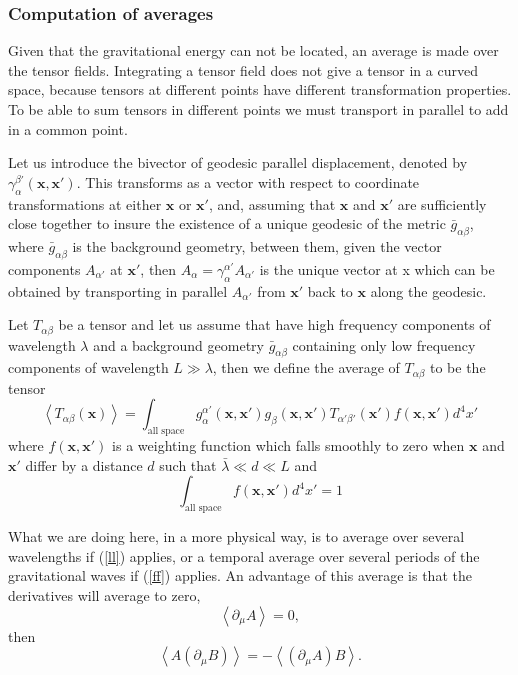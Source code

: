 \subsubsection*{Computation of averages}

Given that the gravitational energy can not be located, an average
is made over the tensor fields. Integrating a tensor field does not
give a tensor in a curved space, because tensors at different points
have different transformation properties. To be able to sum tensors
in different points we must transport in parallel to add in a common
point.

Let us introduce the bivector of geodesic parallel displacement,
denoted by $\gamma_{\alpha}^{\beta'}\left(\boldsymbol{x},\boldsymbol{x}'\right)$.
This transforms as a vector with respect to coordinate transformations
at either $\boldsymbol{x}$ or $\boldsymbol{x}'$, and, assuming that
$\boldsymbol{x}$ and $\boldsymbol{x}'$ are sufficiently close together
to insure the existence of a unique geodesic of the metric $\bar{g}_{\alpha\beta}$,
where $\bar{g}_{\alpha\beta}$ is the background geometry, between
them, given the vector components $A_{\alpha'}$ at $\boldsymbol{x}'$,
then $A_{\alpha}=\gamma_{\alpha}^{\alpha'}A_{\alpha'}$ is the unique
vector at x which can be obtained by transporting in parallel $A_{\alpha'}$
from $\boldsymbol{x}'$ back to $\boldsymbol{x}$ along the geodesic.

Let $T_{\alpha\beta}$ be a tensor and let us assume that have high
frequency components of wavelength $\lambda$ and a background geometry
$\bar{g}_{\alpha\beta}$ containing only low frequency components
of wavelength $L\gg\lambda$, then we define the average of $T_{\alpha\beta}$
to be the tensor
\[
\left\langle T_{\alpha\beta}\left(\boldsymbol{x}\right)\right\rangle =\int_{\text{all space}}g_{\alpha}^{\alpha'}\left(\boldsymbol{x},\boldsymbol{x}'\right)g_{\beta}\left(\boldsymbol{x},\boldsymbol{x}'\right)T_{\alpha'\beta'}\left(\boldsymbol{x}'\right)f\left(\boldsymbol{x},\boldsymbol{x}'\right)d^{4}x'
\]
where $f\left(\boldsymbol{x},\boldsymbol{x}'\right)$ is a weighting
function which falls smoothly to zero when $\boldsymbol{x}$ and $\boldsymbol{x}'$
differ by a distance $d$ such that $\bar{\lambda}\ll d\ll L$ and
\[
\int_{\text{all space}}f\left(\boldsymbol{x},\boldsymbol{x}'\right)d^{4}x'=1
\]

What we are doing here, in a more physical way, is to average over
several wavelengths if (\ref{ll}) applies, or a temporal average
over several periods of the gravitational waves if (\ref{ff}) applies.
An advantage of this average is that the derivatives will average
to zero,
\[
\left\langle \partial_{\mu}A\right\rangle =0,
\]
then
\[
\left\langle A\left(\partial_{\mu}B\right)\right\rangle =-\left\langle \left(\partial_{\mu}A\right)B\right\rangle .
\]


